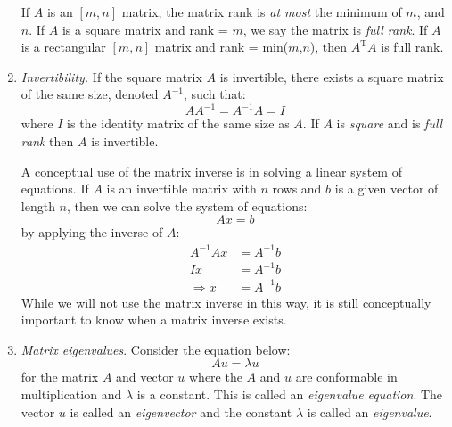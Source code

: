 \begin{enumerate}
\vspace{0.1cm}

\noindent If $A$ is an $[m,n]$ matrix, the matrix rank is \emph{at most} the minimum of $m$, and $n$.  If $A$ is a square matrix and rank = $m$, we say the matrix is \emph{full rank}.  If $A$ is a rectangular $[m,n]$ matrix and rank = min($m$,$n$), then $A^{\text{T}}A$ is full rank.


\item \emph{Invertibility.} If the square matrix $A$ is invertible, there exists a square matrix of the same size, denoted $A^{-1}$, such that:
\begin{equation*}
A A^{-1} = A^{-1}A = I
\end{equation*}
where $I$ is the identity matrix of the same size as $A$.  If $A$ is \emph{square} and is \emph{full rank} then $A$ is invertible.  

A conceptual use of the matrix inverse is in solving a linear system of equations. If $A$ is an invertible matrix with $n$ rows and $b$ is a given vector of length $n$, then we can solve the system of equations:
\begin{equation*}
Ax = b
\end{equation*}
by applying the inverse of $A$:
\begin{align*}
A^{-1}Ax &= A^{-1}b \\
Ix &= A^{-1}b \\
\Rightarrow x &= A^{-1}b
\end{align*}
While we will not use the matrix inverse in this way, it is still conceptually important to know when a matrix inverse exists.

\item \emph{Matrix eigenvalues}.  Consider the equation below:
\begin{equation*}
Au = \lambda u
\end{equation*}
for the matrix $A$ and vector $u$ where the $A$ and $u$ are conformable in multiplication and $\lambda$ is a constant.  This is called an \emph{eigenvalue equation}.  The vector $u$ is called an \emph{eigenvector} and the constant $\lambda$ is called an \emph{eigenvalue}.  


\end{enumerate}

